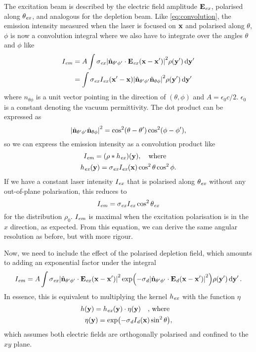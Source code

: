 The excitation beam is described by the electric field amplitude $ \vb{E}_{\mathit{ex}} $, polarised along $ \theta_{\mathit{ex}} $, and analogous for the depletion beam. Like \autoref{eq:convolution}, the emission intensity measured when the laser is focused on $ \vb{x} $ and polarised along $ \theta $, $ \phi $ is now a convolution integral where we also have to integrate over the angles $ \theta $ and $ \phi $ like
\begin{equation}
	\begin{aligned}
		I_{\mathit{em}} 
			&= A \int 
				\sigma_{\mathit{ex}} \abs{\hat{\vb{n}}_{\theta'\phi'} \cdot \vb{E}_{\mathit{ex}}(\vb{x}-\vb{x}')}^2 
				\rho(\vb{y}') 
				\dd{\vb{y}'} \\
			&= \int 
				\sigma_{\mathit{ex}} I_{\mathit{ex}}(\vb{x}'-\vb{x}) \abs{\hat{\vb{n}}_{\theta'\phi'}\hat{\vb{n}}_{\theta\phi}}^2
				\rho(\vb{y}') 
				\dd{\vb{y}'}
	\end{aligned}
\end{equation}
where $ \unit{n}_{\theta\phi} $ is a unit vector pointing in the direction of $ (\theta, \phi) $ and $ A = \epsilon_0c/2 $. $ \epsilon_0 $ is a constant denoting the vacuum permittivity. The dot product can be expressed as
\begin{equation}
	\abs{\hat{\vb{n}}_{\theta'\phi'}\hat{\vb{n}}_{\theta\phi}}^2 = \cos^2(\theta-\theta') \cos^2(\phi-\phi'),
\end{equation}
so we can express the emission intensity as a convolution product like
\begin{gather}
	I_\emm = (\rho*h_\exc)(\vb{y}),\qq{where} \\
	h_\exc(\vb{y}) = \sigma_\exc I_\exc(\vb{x}) \cos^2\theta\cos^2\phi.
\end{gather}
If we have a constant laser intensity $ I_{\mathit{ex}} $ that is polarised along $ \theta_{\mathit{ex}} $ without any out-of-plane polarisation, this reduces to
\begin{equation}
	I_{\mathit{em}} = \sigma_{\mathit{ex}} I_{\mathit{ex}} \cos^2\theta_{\mathit{ex}}
\end{equation}
for the distribution $ \rho_0 $. $ I_{\mathit{em}} $ is maximal when the excitation polarisation is in the $ x $ direction, as expected. From this equation, we can derive the same angular resolution as before, but with more rigour.

Now, we need to include the effect of the polarised depletion field, which amounts to adding an exponential factor under the integral
\begin{equation}
	I_{\mathit{em}} = A \int
		\sigma_{\mathit{ex}} \abs{\hat{\vb{n}}_{\theta'\phi'} \cdot \vb{E}_{\mathit{ex}}(\vb{x}-\vb{x}')}^2  
		\exp(-\sigma_{\mathit{d}} \abs{\hat{\vb{n}}_{\theta'\phi'} \cdot \vb{E}_{\mathit{d}}(\vb{x}-\vb{x}')}^2)
		\rho(\vb{y}') 
		\dd{\vb{y}'}.
	\label{eq:psted integral}
\end{equation}
In essence, this is equivalent to multiplying the kernel $ h_{\mathit{ex}} $ with the function $ \eta $
\begin{gather}
	h(\vb{y}) = h_\exc(\vb{y}) \cdot \eta(\vb{y})  \qq{, where} \\
	\eta(\vb{y}) = \exp(-\sigma_\dep I_\dep(\vb{x}) \sin^2 \theta),
\end{gather}
which assumes both electric fields are orthogonally polarised and confined to the $ xy $ plane.

